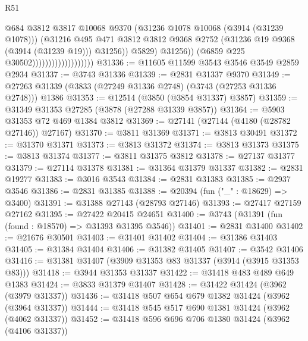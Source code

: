 \begin{lexlean}{R51}
\begin{coremodule}
                                                @684
                                                @3812
                                                @3817
                                                @10068
                                                @9370
                                                (@31236 @1078 @10068 (@3914 (@31239 @1078)))
                                                (@31216
                                                  @495
                                                  @471
                                                  @3812
                                                  @3812
                                                  @9368
                                                  @2752
                                                  (@31236 @19 @9368 (@3914 (@31239 @19)))
                                                  @31256))
                                              @5829)
                                            @31256))
                                        (@6859 @225 @30502)))))))))))))))))))
@31336 := @11605 @11599 @3543 @3546 @3549 @2859 @2934
@31337 := @3743 @31336
@31339 := @2831 @31337 @9370
@31349 := @27263 @31339 (@3833 (@27249 @31336 @2748) (@3743 (@27253 @31336 @2748))) @1386
@31353 := @12514 (@3850 (@3854 @31337) @3857)
@31359 := @31349 @31353 @27285 (@3878 (@27288 @31339 @3857))
@31364 := @5903 @31353 @72 @469 @1384 @3812
@31369 := @27141 (@27144 (@4180 (@28782 @27146)) @27167)
@31370 := @3811 @31369
@31371 := @3813 @30491
@31372 := @31370 @31371
@31373 := @3813 @31372
@31374 := @3813 @31373
@31375 := @3813 @31374
@31377 := @3811 @31375 @3812
@31378 := @27137 @31377
@31379 := @27114 @31378
@31381 := @31364 @31379 @31337
@31382 := @2831 @19277
@31383 := @3016 @3543
@31384 := @2831 @31383
@31385 := @2937 @3546
@31386 := @2831 @31385
@31388 := @20394 (fun ("_" : @18629) => @3400)
@31391 := @31388 @27143 (@28793 @27146)
@31393 := @27417 @27159 @27162
@31395 := @27422 @20415 @24651
@31400 := @3743 (@31391 (fun (found : @18570) => @31393 @31395 @3546))
@31401 := @2831 @31400
@31402 := @21676 @30501
@31403 := @31401 @31402
@31404 := @31386 @31403
@31405 := @31384 @31404
@31406 := @31382 @31405
@31407 := @3542 @31406
@31416 := @31381 @31407 (@3909 @31353 @83 @31337 (@3914 (@3915 @31353 @83)))
@31418 := @3944 @31353 @31337
@31422 := @31418 @483 @489 @649 @1383
@31424 := @3833 @31379 @31407
@31428 := @31422 @31424 (@3962 (@3979 @31337))
@31436 := @31418 @507 @654 @679 @1382 @31424 (@3962 (@3964 @31337))
@31444 := @31418 @545 @517 @690 @1381 @31424 (@3962 (@4062 @31337))
@31452 := @31418 @596 @696 @706 @1380 @31424 (@3962 (@4106 @31337))

\end{coremodule}
\end{lexlean}
